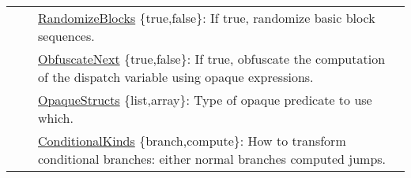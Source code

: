 \begin{table*}[p]
\begin{tabular}{|p{2.25cm}|p{4cm}|p{11cm}|}
                                     &                                                                                                                                                                                                                                                                                                         & \underline{RandomizeBlocks} \{true,false\}: If true, randomize  basic block sequences.                                                                                                                                                                                                                                                                 \\ \cline{3-3} 
                                     &                                                                                                                                                                                                                                                                                                         & \underline{ObfuscateNext} \{true,false\}: If true, obfuscate the computation of the dispatch variable using opaque expressions.                                                                                                                                                                                                                                        \\ \cline{3-3} 
                                     &                                                                                                                                                                                                                                                                                                         & \underline{OpaqueStructs} \{list,array\}: Type of opaque predicate to use which.                                                                                                                                                                                                                                                       \\ \cline{3-3} 
                                     &                                                                                                                                                                                                                                                                                                         & \underline{ConditionalKinds} \{branch,compute\}: How to transform conditional branches: either normal branches computed jumps.                                                                                                                                                                                                          \\ \hline

\end{tabular}
\end{table*}
